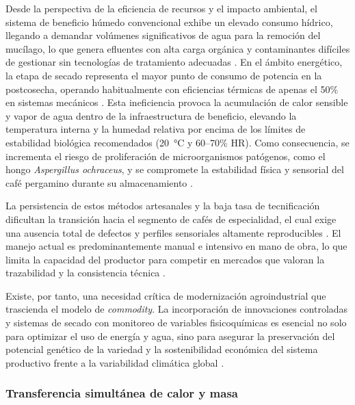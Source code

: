 Desde la perspectiva de la eficiencia de recursos y el impacto ambiental, el sistema de beneficio húmedo convencional exhibe un elevado consumo hídrico, llegando a demandar volúmenes significativos de agua para la remoción del mucílago, lo que genera efluentes con alta carga orgánica y contaminantes difíciles de gestionar sin tecnologías de tratamiento adecuadas \parencite{polakova_changes_2022, escuela_superior_politecnica_agropecuaria_de_manabi_manuel_felix_lopez_carrera_de_ingenieria_agricola_postharvest_2023, rodriguez_effect_2020}. En el ámbito energético, la etapa de secado representa el mayor punto de consumo de potencia en la postcosecha, operando habitualmente con eficiencias térmicas de apenas el 50\% en sistemas mecánicos \parencite{osorio_hernandez_bioclimatic_2018, osorio_hernandez_computational_2020}. Esta ineficiencia provoca la acumulación de calor sensible y vapor de agua dentro de la infraestructura de beneficio, elevando la temperatura interna y la humedad relativa por encima de los límites de estabilidad biológica recomendados (20~°C y 60--70\% HR). Como consecuencia, se incrementa el riesgo de proliferación de microorganismos patógenos, como el hongo \textit{Aspergillus ochraceus}, y se compromete la estabilidad física y sensorial del café pergamino durante su almacenamiento \parencite{osorio_hernandez_bioclimatic_2018, osorio_hernandez_simulation_2015}.

La persistencia de estos métodos artesanales y la baja tasa de tecnificación dificultan la transición hacia el segmento de cafés de especialidad, el cual exige una ausencia total de defectos y perfiles sensoriales altamente reproducibles \parencite{barbosa_sensory_2019, febrianto_coffee_2023}. El manejo actual es predominantemente manual e intensivo en mano de obra, lo que limita la capacidad del productor para competir en mercados que valoran la trazabilidad y la consistencia técnica \parencite{carmo_quality_2020, febrianto_coffee_2023}. 

Existe, por tanto, una necesidad crítica de modernización agroindustrial que trascienda el modelo de \textit{commodity}. La incorporación de innovaciones controladas y sistemas de secado con monitoreo de variables fisicoquímicas es esencial no solo para optimizar el uso de energía y agua, sino para asegurar la preservación del potencial genético de la variedad y la sostenibilidad económica del sistema productivo frente a la variabilidad climática global \parencite{febrianto_coffee_2023, hasan_comparative_2024}.

\subsubsection{Transferencia simultánea de calor y masa}

